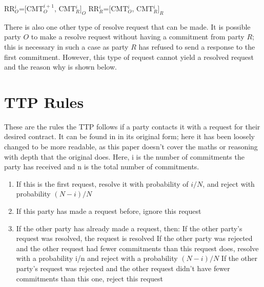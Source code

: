 \documentclass{l4proj}
\begin{document}
\centerline{RR${_{O}^{i}}$=$[$CMT${_{O}^{i+1}}$, CMT${_{R}^{i}}]_O$ \hspace{30mm}  RR${_{R}^{i}}$=$[$CMT${_{O}^{i}}$, CMT${_{R}^{i}}]_R$}

There is also one other type of resolve request that can be made. It is possible party $O$ to make a resolve request without having a commitment from party $R$; this is necessary in such a case as party $R$ has refused to send a response to the first commitment. However, this type of request cannot yield a resolved request and the reason why is shown below.


\section{TTP Rules}
These are the rules the TTP follows if a party contacts it with a request for their desired contract. It can be found in \cite{ASW09} in its original form; here it has been loosely changed to be more readable, as this paper doesn't cover the maths or reasoning with depth that the original does. Here, i is the number of commitments the party has received and n is the total number of commitments.

\begin{enumerate}
\item If this is the first request, resolve it with probability of $i/N$, and reject with probability $(N-i)/N$
\item If this party has made a request before, ignore this request
\item If the other party has already made a request, then:
\subitem If the other party's request was resolved, the request is resolved
\subitem If the other party was rejected and the other request had fewer commitments than this request does, resolve with a probability i/n and reject with a probability $(N-i)/N$
\subitem If the other party's request was rejected and the other request didn't have fewer commitments than this one, reject this request
\end{enumerate}

\end{document}
